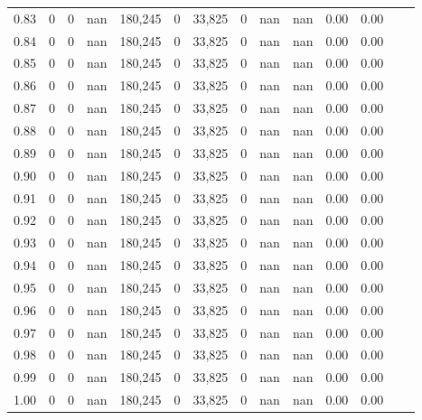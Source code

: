 \begin{tabular}{rrrrrrrrrrrrrr}
0.83 &       0 &      0 &     nan &  180,245 &        0 &  33,825 &       0 &   nan &   nan &  0.00 &      0.00 \\
0.84 &       0 &      0 &     nan &  180,245 &        0 &  33,825 &       0 &   nan &   nan &  0.00 &      0.00 \\
0.85 &       0 &      0 &     nan &  180,245 &        0 &  33,825 &       0 &   nan &   nan &  0.00 &      0.00 \\
0.86 &       0 &      0 &     nan &  180,245 &        0 &  33,825 &       0 &   nan &   nan &  0.00 &      0.00 \\
0.87 &       0 &      0 &     nan &  180,245 &        0 &  33,825 &       0 &   nan &   nan &  0.00 &      0.00 \\
0.88 &       0 &      0 &     nan &  180,245 &        0 &  33,825 &       0 &   nan &   nan &  0.00 &      0.00 \\
0.89 &       0 &      0 &     nan &  180,245 &        0 &  33,825 &       0 &   nan &   nan &  0.00 &      0.00 \\
0.90 &       0 &      0 &     nan &  180,245 &        0 &  33,825 &       0 &   nan &   nan &  0.00 &      0.00 \\
0.91 &       0 &      0 &     nan &  180,245 &        0 &  33,825 &       0 &   nan &   nan &  0.00 &      0.00 \\
0.92 &       0 &      0 &     nan &  180,245 &        0 &  33,825 &       0 &   nan &   nan &  0.00 &      0.00 \\
0.93 &       0 &      0 &     nan &  180,245 &        0 &  33,825 &       0 &   nan &   nan &  0.00 &      0.00 \\
0.94 &       0 &      0 &     nan &  180,245 &        0 &  33,825 &       0 &   nan &   nan &  0.00 &      0.00 \\
0.95 &       0 &      0 &     nan &  180,245 &        0 &  33,825 &       0 &   nan &   nan &  0.00 &      0.00 \\
0.96 &       0 &      0 &     nan &  180,245 &        0 &  33,825 &       0 &   nan &   nan &  0.00 &      0.00 \\
0.97 &       0 &      0 &     nan &  180,245 &        0 &  33,825 &       0 &   nan &   nan &  0.00 &      0.00 \\
0.98 &       0 &      0 &     nan &  180,245 &        0 &  33,825 &       0 &   nan &   nan &  0.00 &      0.00 \\
0.99 &       0 &      0 &     nan &  180,245 &        0 &  33,825 &       0 &   nan &   nan &  0.00 &      0.00 \\
1.00 &       0 &      0 &     nan &  180,245 &        0 &  33,825 &       0 &   nan &   nan &  0.00 &      0.00 \\
\bottomrule
\end{tabular}
